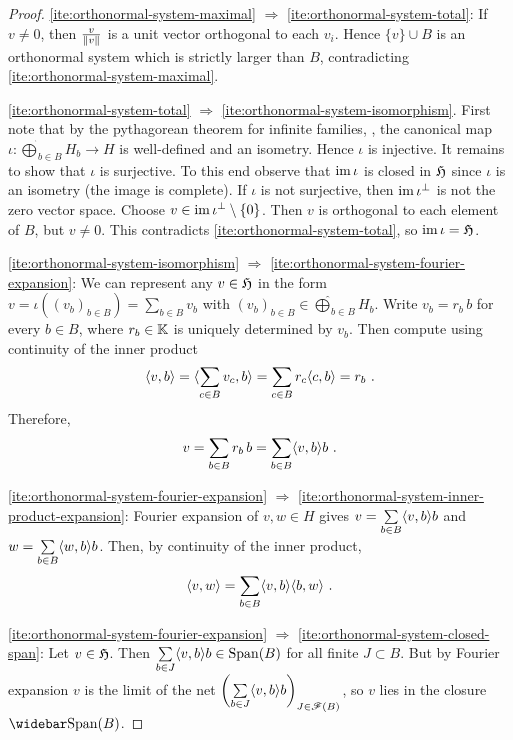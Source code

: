 \begin{proof}
 \ref{ite:orthonormal-system-maximal} $\Rightarrow$ \ref{ite:orthonormal-system-total}:
   If $v \neq 0$, then $\frac{v}{\left\|v\right\|}$ is a unit vector orthogonal to each $v_i$. Hence $\{v\} \cup B$ 
   is an orthonormal system which is strictly larger than $B$, contradicting \ref{ite:orthonormal-system-maximal}.

 \ref{ite:orthonormal-system-total} $\Rightarrow$ \ref{ite:orthonormal-system-isomorphism}. 
   First note that by the pythagorean theorem for infinite families, ,
   the canonical map $\iota: \widehat{\bigoplus}_{b \in B} H_b \rightarrow H$ is well-defined and an isometry. 
   Hence $\iota$ is injective. It remains to show that $\iota$ is surjective. 
   To this end observe that $\operatorname{im} \iota$ is closed in $\mathfrak{H}$ since $\iota$ is an isometry (the image is complete). 
   If $\iota$ is not surjective, then $\operatorname{im} \iota^\perp$ is not the zero vector space. 
   Choose $v \in \operatorname{im} \iota^\perp \setminus \{ 0\}$. 
   Then $v$ is orthogonal to each element of $B$, but $v \neq 0$. This contradicts 
   \ref{ite:orthonormal-system-total}, so $\operatorname{im} \iota = \mathfrak{H}$.

  \ref{ite:orthonormal-system-isomorphism} $\Rightarrow$ \ref{ite:orthonormal-system-fourier-expansion}: 
    We can represent any $v \in \mathfrak{H}$ in the form $v = \iota \left( (v_b)_{b \in B} \right) = 
    \sum_{b\in B} v_b$ with $\left( v_b \right)_{b\in B} \in \widehat{\bigoplus}_{b \in B}  H_b$. 
    Write $v_b = r_b \, b$ for every $b\in B$, where $r_b \in \mathbb{K}$ is uniquely determined by $v_b$. 
    Then compute using continuity of the inner product
    \[
      \langle v, b \rangle = \langle \sum_{c \in B} v_c, b \rangle = \sum_{c \in B} r_c \langle c, b \rangle = r_b \ .
    \]
    Therefore,
    \[
       v = \sum_{b \in B} r_b \, b = \sum_{b \in B} \langle v, b \rangle b \ .
    \]

  \ref{ite:orthonormal-system-fourier-expansion} $\Rightarrow$ \ref{ite:orthonormal-system-inner-product-expansion}:
  Fourier expansion of $v, w \in H$ gives $v = \sum\limits_{b \in B} \langle v, b \rangle b$ and 
  $w = \sum\limits_{b \in B} \langle w, b \rangle b$.   Then, by continuity of the inner product,
  \[
    \langle v, w \rangle = \sum\limits_{b \in B} \langle v, b \rangle\langle b, w \rangle \ .
  \]

  \ref{ite:orthonormal-system-fourier-expansion} $\Rightarrow$ \ref{ite:orthonormal-system-closed-span}:
  Let $v\in \mathfrak{H}$. Then $\sum\limits_{b\in J}\langle v, b \rangle b \in \operatorname{Span} (B)$ for all finite  $J \subset B$.
  But by Fourier expansion $v$ is the limit of the net 
  $\left( \sum\limits_{b\in J}\langle v, b \rangle b \right)_{J\in \mathscr{F} (B)} $, so $v$ lies in the closure 
  $\clSpan (B)$.


\end{proof}
